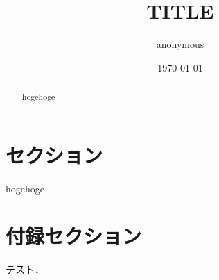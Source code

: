 \documentclass[a4paper,11pt]{jsarticle}
\theoremstyle{definition}
\numberwithin{equation}{section}
\begin{document}
\title{
    TITLE
}
\author{
    anonymous 
}
\date{\today}




\maketitle

\begin{abstract}
hogehoge
\end{abstract}

\section{セクション}

hogehoge

% 

\appendix

\section{付録セクション}

テスト．
\end{document}
